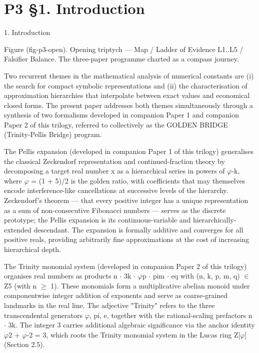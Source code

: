 
\section{P3 §1. Introduction}

1. Introduction

      Figure (fig-p3-open). Opening triptych --- Map / Ladder of Evidence L1..L5 / Falsifier Balance.
                       The three-paper programme charted as a compass journey.

  Two recurrent themes in the mathematical analysis of numerical constants are (i) the
  search for compact symbolic representations and (ii) the characterisation of
  approximation hierarchies that interpolate between exact values and economical closed
  forms. The present paper addresses both themes simultaneously through a synthesis of
  two formalisms developed in companion Paper 1 and companion Paper 2 of this trilogy,
  referred to collectively as the GOLDEN BRIDGE (Trinity-Pellis Bridge) program.

  The Pellis expansion (developed in companion Paper 1 of this trilogy) generalises the
  classical Zeckendorf representation and continued-fraction theory by decomposing a
  target real number x as a hierarchical series in powers of $\varphi$-k, where $\varphi$ = (1 + 5)/2 is
  the golden ratio, with coefficients that may themselves encode interference-like
  cancellations at successive levels of the hierarchy. Zeckendorf's theorem --- that every
  positive integer has a unique representation as a sum of non-consecutive Fibonacci
  numbers --- serves as the discrete prototype; the Pellis expansion is its
  continuous-variable and hierarchically-extended descendant. The expansion is formally
  additive and converges for all positive reals, providing arbitrarily fine approximations at
  the cost of increasing hierarchical depth.

  The Trinity monomial system (developed in companion Paper 2 of this trilogy) organises
  real numbers as products n $\cdot$ 3k $\cdot$ $\varphi$p $\cdot$ pim $\cdot$ eq with (n, k, p, m, q) $\in$ Z5 (with n $\geq$ 1).
  These monomials form a multiplicative abelian monoid under componentwise integer
  addition of exponents and serve as coarse-grained landmarks in the real line. The
  adjective "Trinity" refers to the three transcendental generators $\varphi$, pi, e, together with
  the rational-scaling prefactors n $\cdot$ 3k. The integer 3 carries additional algebraic
  significance via the anchor identity $\varphi$2 + $\varphi$-2 = 3, which roots the Trinity monomial
  system in the Lucas ring Z[$\varphi$] (Section 2.5).


